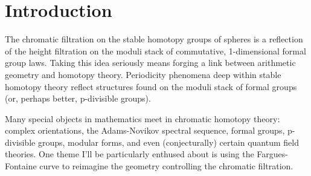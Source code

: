 \newpage
\section{Introduction}
\vspace{2ex}


The chromatic filtration on the stable homotopy groups of spheres is a reflection of the height filtration on the moduli stack of commutative, 1-dimensional formal group laws. Taking this idea seriously means forging a link between arithmetic geometry and homotopy theory. Periodicity phenomena deep within stable homotopy theory reflect structures found on the moduli stack of formal groups (or, perhaps better, p-divisible groups).

Many special objects in mathematics meet in chromatic homotopy theory: complex orientations, the Adams-Novikov spectral sequence, formal groups, p-divisible groups, modular forms, and even (conjecturally) certain quantum field theories. One theme I'll be particularly enthused about is using the Fargues-Fontaine curve to reimagine the geometry controlling the chromatic filtration. 

